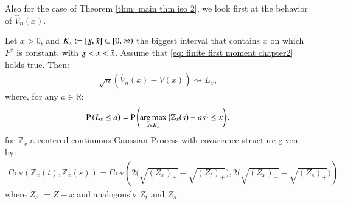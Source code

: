 Also for the case of Theorem \ref{thm: main thm iso 2}, we look first at the behavior of $\hat{V}_n(x)$. 

\begin{theorem}\label{thm: distrib flat F at x}
    Let $x > 0$, and $K_x :=[\ubar{x},\bar{x}] \subset [0,\infty)$ the biggest interval that contains $x$ on which $F^*$ is constant, with $\ubar{x} < x < \bar{x}$. Assume that \eqref{eq: finite first moment chapter2} holds true. Then:
    \begin{align*}
        \sqrt{n} \left( \hat{V}_n(x) - V(x) \right) \rightsquigarrow L_x,
    \end{align*}
    where, for any $a \in \mathbb{R}$:
    \begin{align*}
        \mathrm{P} \left( L_x \leq a \right) = \mathrm{P} \left( \operatorname*{arg\,max}_{s \in K_x} \left\{ \mathbb{Z}_x(s) - a s\right\} \leq x \right). 
    \end{align*}
    for $\mathbb{Z}_x$ a centered continuous Gaussian Process with covariance structure given by:
    \begin{align}
        \mathrm{Cov} \left( \mathbb{Z}_x(t),\mathbb{Z}_x(s) \right) =  \mathrm{Cov} \left( 2 \big( \sqrt{(Z_x)_{+}} - \sqrt{(Z_t)_{+}} \big), 2 \big( \sqrt{(Z_x)_{+}} - \sqrt{(Z_s)_{+}} \big) \right).
    \end{align}
    where $Z_x := Z-x$ and analogously $Z_t$ and $Z_s$.
\end{theorem}
